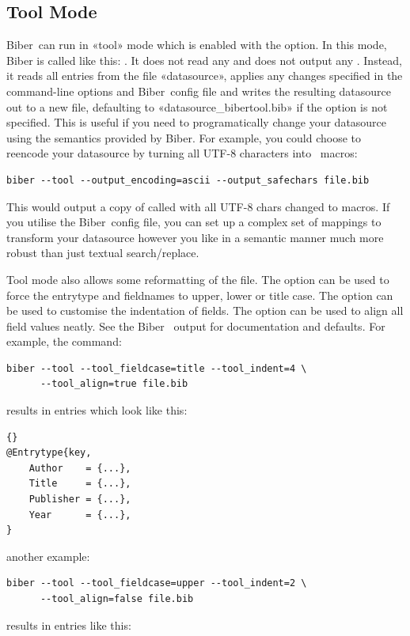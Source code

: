 \documentclass{ltxdockit}
\newcommand*{\biber}{Biber\xspace}
\begin{document}
\subsection{Tool Mode}\label{tool}
\biber\ can run in «tool» mode which is enabled with the 
option. In this mode, \biber is called like this: . It does not read any  and does not output
any . Instead, it reads all entries from the file
«datasource», applies any changes specified in the command-line
options and \biber\ config file and writes the resulting datasource
out to a new file, defaulting to «datasource\_bibertool.bib» if the
option  is not specified. This is useful if you need to
programatically change your datasource using the semantics provided by
\biber. For example, you could choose to reencode your datasource by
turning all UTF-8 characters into \latex\ macros:

\begin{verbatim}
biber --tool --output_encoding=ascii --output_safechars file.bib
\end{verbatim}

\noindent This would output a copy of  called  with all
UTF-8 chars changed to \latex macros. If you utilise the \biber\
config file, you can set up a complex set of mappings to transform
your datasource however you like in a semantic manner much more robust
than just textual search/replace.

Tool mode also allows some reformatting of the  file. The
option \opt{--tool\_fieldcase} can be used to force the entrytype and
fieldnames to upper, lower or title case. The option
 can be used to customise the indentation of
fields. The option \opt{tool\_align} can be used to align all field
values neatly. See the \biber\ \opt{--help} output for documentation
and defaults. For example, the command:

\begin{verbatim}
biber --tool --tool_fieldcase=title --tool_indent=4 \
      --tool_align=true file.bib
\end{verbatim}
%
results in  entries which look like this:

\begin{lstlisting}[style=bibtex, columns=fixed]{}
@Entrytype{key,
    Author    = {...},
    Title     = {...},
    Publisher = {...},
    Year      = {...},
}
\end{lstlisting}
%
another example:
\begin{verbatim}
biber --tool --tool_fieldcase=upper --tool_indent=2 \
      --tool_align=false file.bib
\end{verbatim}
%
results in entries like this:
\end{document}

